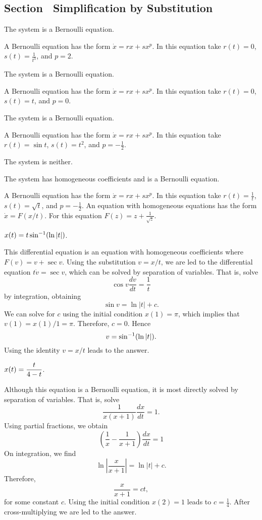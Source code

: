 \newpage
\subsection*{Section~\protect{\ref{sec:SBS}} Simplification by Substitution}

 \ans The system is a Bernoulli equation.

\soln A Bernoulli equation has the form $\dot{x}=rx+sx^p$.  In this equation
take $r(t)=0$, $s(t)= \frac{1}{t^3}$, and $p=2$.

 \ans The system is a Bernoulli equation.

\soln A Bernoulli equation has the form $\dot{x}=rx+sx^p$.  In this equation
take $r(t)=0$, $s(t)=t$, and $p=0$.

 \ans The system is a Bernoulli equation.

\soln A Bernoulli equation has the form $\dot{x}=rx+sx^p$.  In this equation
take $r(t)=\sin t$, $s(t)=t^2$, and $p=-\frac{1}{2}$.

 \ans The system is neither.

 \ans The system has homogeneous coefficients and is a
Bernoulli equation.

\soln A Bernoulli equation has the form $\dot{x}=rx+sx^p$.  In this equation
take $r(t)=\frac{1}{t}$, $s(t)=\sqrt{t}$, and $p=-\frac{1}{2}$.  An equation
with homogeneous equations has the form $\dot{x}=F(x/t)$.  For this equation
$F(z) = z + \frac{1}{\sqrt{z}}$.

 \ans $x(t) = t\sin^{-1}(\ln|t|)$.

\soln  This differential equation is an equation with homogeneous
coefficients where $F(v) = v + \sec v$.  Using the substitution $v=x/t$, we
are led to the differential equation $t\dot{v}=\sec v$, which can be solved
by separation of variables.  That is, solve
\[
\cos v \frac{dv}{dt} = \frac{1}{t}
\]
by integration, obtaining
\[
\sin v = \ln|t| + c.
\]
We can solve for $c$ using the initial condition $x(1)=\pi$, which implies
that $v(1)=x(1)/1=\pi$.  Therefore, $c=0$.  Hence
\[
v = \sin^{-1}(\ln|t|).
\]
Using the identity $v=x/t$ leads to the answer. 
 

 \ans $x(t) = \displaystyle\frac{t}{4-t}$.

\soln  Although this equation is a Bernoulli equation, it is most directly
solved by separation of variables.  That is, solve
\[
\frac{1}{x(x+1)}\frac{dx}{dt} = 1.
\]
Using partial fractions, we obtain
\[
\left(\frac{1}{x}-\frac{1}{x+1}\right)\frac{dx}{dt} = 1
\]
On integration, we find
\[
\ln\left|\frac{x}{x+1}\right| = \ln|t| + c.
\]
Therefore,
\[
\frac{x}{x+1} = ct,
\]
for some constant $c$.  Using the initial condition $x(2)=1$ leads to
$c=\frac{1}{4}$.  After cross-multiplying we are led to the answer.

